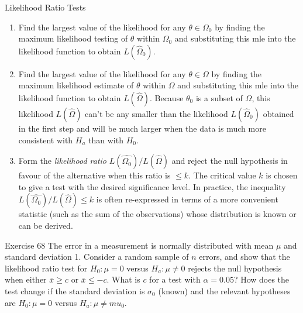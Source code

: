 \documentclass[
  ignorenonframetext,
]{beamer}
\providecommand{\tightlist}{%
  \setlength{\itemsep}{0pt}\setlength{\parskip}{0pt}}\usepackage{longtable,booktabs,array}
\begin{document}
\begin{frame}{Likelihood Ratio Tests}
\protect\hypertarget{likelihood-ratio-tests-1}{}
\begin{enumerate}[<+->]
\tightlist
\item
  Find the largest value of the likelihood for any
  \(\theta \in \Omega_{0}\) by finding the maximum likelihood testing of
  \(\theta\) within \(\Omega_{0}\) and substituting this mle into the
  likelihood function to obtain \(L(\hat\Omega_{0})\).
\item
  Find the largest value of the likelihood for any \(\theta \in \Omega\)
  by finding the maximum likelihood estimate of \(\theta\) within
  \(\Omega\) and substituting this mle into the likelihood function to
  obtain \(L(\hat\Omega)\). Because \(\theta_{0}\) is a subset of
  \(\Omega\), this likelihood \(L(\hat\Omega)\) can't be any smaller
  than the likelihood \(L(\hat\Omega_{0})\) obtained in the first step
  and will be much larger when the data is much more consistent with
  \(H_{a}\) than with \(H_{0}\).
\item
  Form the \emph{likelihood ratio} \(L(\hat{\Omega_{0}})/L(\hat\Omega)\)
  and reject the null hypothesis in favour of the alternative when this
  ratio is \(\leq k\). The critical value \(k\) is chosen to give a test
  with the desired significance level. In practice, the inequality
  \(L(\hat{\Omega_{0}})/L(\hat\Omega) \leq k\) is often re-expressed in
  terms of a more convenient statistic (such as the sum of the
  observations) whose distribution is known or can be derived.
\end{enumerate}
\end{frame}

\begin{frame}{Exercise 68}
\protect\hypertarget{exercise-68}{}
The error in a measurement is normally distributed with mean \(\mu\) and
standard deviation 1. Consider a random sample of \(n\) errors, and show
that the likelihood ratio test for \(H_{0}: \mu = 0\) versus
\(H_{a}: \mu \neq 0\) rejects the null hypothesis when either
\(\bar{x} \geq c\) or \(\bar{x} \leq -c\). What is \(c\) for a test with
\(\alpha = 0.05\)? How does the test change if the standard deviation is
\(\sigma_{0}\) (known) and the relevant hypotheses are
\(H_{0}: \mu = 0\) versus \(H_{a}: \mu \neq mu_{0}\).
\end{frame}
\end{document}
